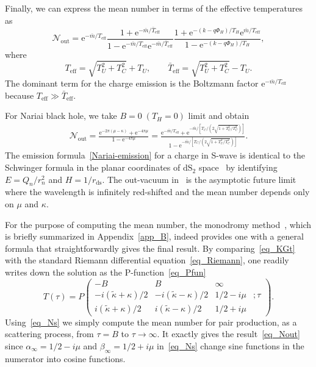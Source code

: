 \documentclass[aps,nofootinbib,superscriptaddress
]{revtex4}
\begin{document}
Finally, we can express the mean number in terms of the effective temperatures as
\begin{equation}
\mathcal{N}_\mathrm{out} = \mathrm{e}^{-\bar{m}/T_\mathrm{eff}} \frac{1 + \mathrm{e}^{-\bar{m}/\bar{T}_\mathrm{eff}}}{1 - \mathrm{e}^{-\bar{m}/T_\mathrm{eff}} \mathrm{e}^{-\bar{m}/{\bar T}_\mathrm{eff}}} \frac{1 + \mathrm{e}^{-(k - q \Phi_H)/T_H} \mathrm{e}^{\bar{m}/T_\mathrm{eff}}}{1 - \mathrm{e}^{-(k - q \Phi_H)/T_H} },
\end{equation}
where
\begin{equation} \label{eff-tem}
T_\mathrm{eff} = \sqrt{T_U^2 + T_C^2} + T_U, \qquad {\bar T}_\mathrm{eff} = \sqrt{T_U^2 + T_C^2} - T_U.
\end{equation}
The dominant term for the charge emission is the Boltzmann factor $\mathrm{e}^{-\bar{m}/T_\mathrm{eff}}$ because $T_\mathrm{eff} \gg \bar{T}_\mathrm{eff}$.


For Nariai black hole, we take $B = 0 \; (T_H = 0)$ limit and obtain
\begin{eqnarray} \label{Nariai-emission}
\mathcal{N}_\mathrm{out} = \frac{\mathrm{e}^{-2 \pi (\mu - \kappa)} + \mathrm{e}^{-4 \pi \mu} }{1 - \mathrm{e}^{-4 \pi \mu}}
= \frac{\mathrm{e}^{-\bar{m}/T_\mathrm{eff}} + \mathrm{e}^{-\bar{m}/[ T_C /( 2 \sqrt{1 + T_U^2/T_C^2} ) ]}}{1 - \mathrm{e}^{-\bar{m}/[ T_C /( 2 \sqrt{1 + T_U^2/T_C^2} ) ]}}.
\end{eqnarray}
The emission formula~\eqref{Nariai-emission} for a charge in S-wave is identical to the Schwinger formula in the planar coordinates of $\mathrm{dS}_2$ space~\cite{Cai:2014qba} by identifying $E = Q_n/r_n^2$ and $H = 1/r_\mathrm{ds}$. The out-vacuum in~\cite{Cai:2014qba} is the asymptotic future limit where the wavelength is infinitely red-shifted and the mean number depends only on $\mu$ and $\kappa$.


For the purpose of computing the mean number, the monodromy method~\cite{Chen:2022hpe}, which is briefly summarized in Appendix~\ref{app_B}, indeed provides one with a general formula that straightforwardly gives the final result. By comparing~\eqref{eq_KGt} with the standard Riemann differential equation~\eqref{eq_Riemann}, one readily writes down the solution as the P-function~\eqref{eq_Pfun}
\begin{equation} \label{eq_Pout}
T(\tau) = P\begin{pmatrix} -B & B & \infty & \\ -i (\tilde{\kappa} + \kappa)/2 & -i (\tilde{\kappa} - \kappa)/2 & 1/2 - i \mu & ; \tau \\ i (\tilde{\kappa} + \kappa)/2 & i (\tilde{\kappa} - \kappa)/2 & 1/2 + i \mu & \end{pmatrix}.
\end{equation}
Using~\eqref{eq_Ns} we simply compute the mean number for pair production, as a scattering process, from $\tau = B$ to $\tau \to \infty$. It exactly gives the result~\eqref{eq_Nout} since $\alpha_\infty = 1/2 - i \mu$ and $\beta_\infty = 1/2 + i \mu$ in~\eqref{eq_Ns} change sine functions in the numerator into cosine functions.
\end{document}
